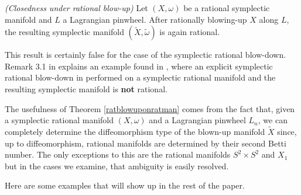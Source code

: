 \begin{Theorem}\emph{(Closedness under rational blow-up)}\label{ratblowuponratman}
Let $(X,\omega)$ be a rational symplectic manifold and $L$ a Lagrangian pinwheel. After rationally blowing-up $X$ along $L$, the resulting symplectic manifold $(\widetilde{X},\tilde{\omega})$ is again rational.
\end{Theorem}

\begin{remark}
This result is certainly false for the case of the symplectic rational blow-down. Remark 3.1 in \cite{BLW} explains an example found in \cite{Dorfm}, where an explicit symplectic rational blow-down in performed on a symplectic rational manifold and the resulting symplectic manifold is \textbf{not} rational.
\end{remark}

The usefulness of Theorem \ref{ratblowuponratman} comes from the fact that, given a symplectic rational manifold $(X,\omega)$ and a Lagrangian pinwheel $L_n$, we can completely determine the diffeomorphism type of the blown-up manifold $\widetilde{X}$ since, up to diffeomorphism, rational manifolds are determined by their second Betti number. The only exceptions to this are the rational manifolds $S^2\times S^2$ and $X_1$ but in the cases we examine, that ambiguity is easily resolved.

Here are some examples that will show up in the rest of the paper.


